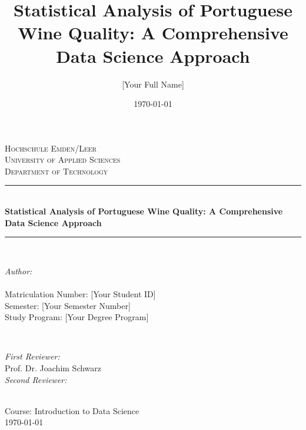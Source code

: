 \documentclass[12pt,a4paper,oneside]{report}
\title{Statistical Analysis of Portuguese Wine Quality: A Comprehensive Data Science Approach}
\author{[Your Full Name]}
\date{\today}
\newcommand{\HRule}{\rule{\linewidth}{0.5mm}}
\begin{document}
	
	\begin{titlepage}
		\center
		
		\textsc{\LARGE Hochschule Emden/Leer}\\[1.5cm]
		\textsc{\Large University of Applied Sciences}\\[0.5cm]
		\textsc{\large Department of Technology}\\[0.5cm]
		
		\HRule \\[0.4cm]
		{\huge \bfseries Statistical Analysis of Portuguese Wine Quality: A Comprehensive Data Science Approach}\\[0.4cm]
		\HRule \\[1.5cm]
		
		\begin{minipage}{0.4\textwidth}
			\begin{flushleft} \large
				\emph{Author:}\\
				[Your Full Name]\\
				Matriculation Number: [Your Student ID]\\
				Semester: [Your Semester Number]\\
				Study Program: [Your Degree Program]
			\end{flushleft}
		\end{minipage}
		~
		\begin{minipage}{0.4\textwidth}
			\begin{flushright} \large
				\emph{First Reviewer:} \\
				Prof. Dr. Joachim Schwarz\\[0.5cm]
				\emph{Second Reviewer:} \\
				[Insert Second Reviewer Name]
			\end{flushright}
		\end{minipage}\\[2cm]
		
		{\large Course: Introduction to Data Science}\\[0.5cm]
		{\large \today}\\[2cm]
		
		\vfill
		
	\end{titlepage}
	
	\tableofcontents
	\newpage
	
	\listoffigures
	\newpage
	
	\listoftables
	\newpage
	











	
\end{document}
